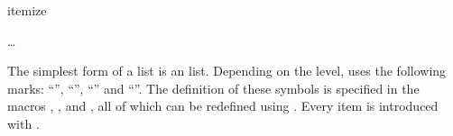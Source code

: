 \ifCommonscrextend\else
\begin{Declaration}
  \begin{Environment}{itemize}
    \begin{Body}
       \dots
      \BodyDots
    \end{Body}
  \end{Environment}
\end{Declaration}%
The simplest form of a list is an  list.
\iffalse %
The users of a certain disliked word processing package often refer to
this form of a list as \emph{bulletpoints}.  Presumably, these users
are unable to envisage that, depending on the level, a different
symbol from a large dot could be used to introduce each
point. %
\fi%
Depending on the level, {\KOMAScript} uses the following marks:
``{}'', ``{}'', ``{}'' and
``{}''. The definition of these symbols is specified in
the macros , ,
 and , all of which can be
redefined using . Every item is introduced with
.%
%
\ifCommonmaincls
